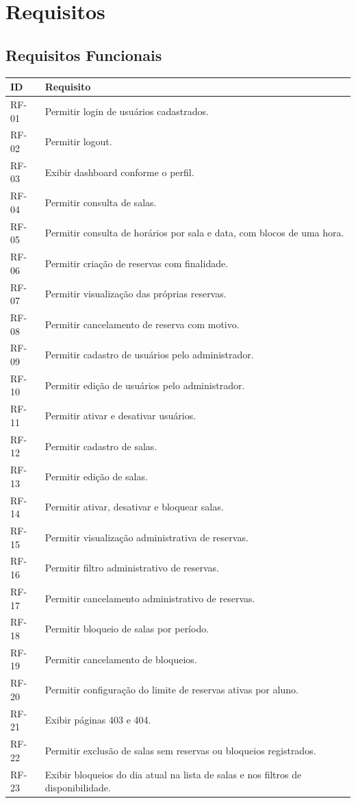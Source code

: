 \documentclass[12pt,a4paper]{article}
\begin{document}
\section{Requisitos}

\subsection{Requisitos Funcionais}
\begin{longtable}{|p{2cm}|p{12cm}|}
\hline
\textbf{ID} & \textbf{Requisito} \\ \hline
RF-01 & Permitir login de usuários cadastrados. \\ \hline
RF-02 & Permitir logout. \\ \hline
RF-03 & Exibir dashboard conforme o perfil. \\ \hline
RF-04 & Permitir consulta de salas. \\ \hline
RF-05 & Permitir consulta de horários por sala e data, com blocos de uma hora. \\ \hline
RF-06 & Permitir criação de reservas com finalidade. \\ \hline
RF-07 & Permitir visualização das próprias reservas. \\ \hline
RF-08 & Permitir cancelamento de reserva com motivo. \\ \hline
RF-09 & Permitir cadastro de usuários pelo administrador. \\ \hline
RF-10 & Permitir edição de usuários pelo administrador. \\ \hline
RF-11 & Permitir ativar e desativar usuários. \\ \hline
RF-12 & Permitir cadastro de salas. \\ \hline
RF-13 & Permitir edição de salas. \\ \hline
RF-14 & Permitir ativar, desativar e bloquear salas. \\ \hline
RF-15 & Permitir visualização administrativa de reservas. \\ \hline
RF-16 & Permitir filtro administrativo de reservas. \\ \hline
RF-17 & Permitir cancelamento administrativo de reservas. \\ \hline
RF-18 & Permitir bloqueio de salas por período. \\ \hline
RF-19 & Permitir cancelamento de bloqueios. \\ \hline
RF-20 & Permitir configuração do limite de reservas ativas por aluno. \\ \hline
RF-21 & Exibir páginas 403 e 404. \\ \hline
RF-22 & Permitir exclusão de salas sem reservas ou bloqueios registrados. \\ \hline
RF-23 & Exibir bloqueios do dia atual na lista de salas e nos filtros de disponibilidade. \\ \hline
\end{longtable}
\end{document}
